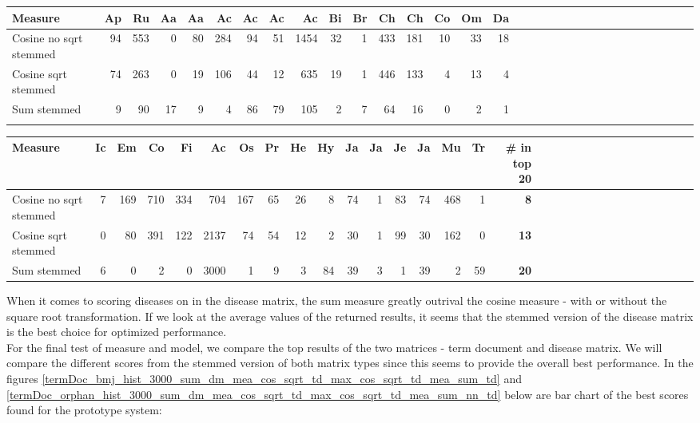 \begin{table}[H]
\begin{tiny}
  \begin{tabular}{|l|r|r|r|r|r|r|r|r|r|r|r|r|r|r|r|r|r|r|r|r|r|r|r|r|r|r|r|r|r|r|r|}
    \hline
    Measure &Ap&Ru&Aa&Aa&Ac&Ac&Ac&Ac&Bi&Br&Ch&Ch&Co&Om&Da\\
    \hline
    Cosine no sqrt stemmed &94&553&0&80&284&94&51&1454&32&1&433&181&10&33&18 \\
    \hline
    Cosine sqrt stemmed &74&263&0&19&106&44&12&635&19&1&446&133&4&13&4 \\
    \hline
    Sum stemmed &9&90&17&9&4&86&79&105&2&7&64&16&0&2&1\\
    \hline
    \multicolumn{16}{c}{} \\
    \end{tabular}
    \begin{tabular}{|l|r|r|r|r|r|r|r|r|r|r|r|r|r|r|r|r|r|r|r|r|r|r|r|r|r|r|r|r|r|r|}
    \hline
     Measure &Ic&Em&Co&Fi&Ac&Os&Pr&He&Hy&Ja&Ja&Je&Ja&Mu&Tr &  \scriptsize{\textbf{\# in top 20}} \\
    \hline
     Cosine no sqrt stemmed &7&169&710&334&704&167&65&26&8&74&1&83&74&468&1 & \scriptsize{\textbf{8}} \\
    \hline
     Cosine sqrt stemmed &0&80&391&122&2137&74&54&12&2&30&1&99&30&162&0 &\scriptsize{\textbf{13}} \\
    \hline
     Sum stemmed &6&0&2&0&3000&1&9&3&84&39&3&1&39&2&59 & \scriptsize{\textbf{20}} \\
     \hline
  \end{tabular}
\end{tiny}
\end{table}

When it comes to scoring diseases on in the disease matrix, the sum measure greatly outrival the 
cosine measure - with or without the square root transformation. If we look at the average values 
of the returned results, it seems that the stemmed version of the disease matrix is the best choice 
for optimized performance. \\

For the final test of measure and model, we compare the top results of the two matrices - term 
document and disease matrix. We will compare the different scores from the stemmed version of 
both matrix types since this seems to provide the overall best performance. In the figures 
\ref{termDoc_bmj_hist_3000_sum_dm_mea_cos_sqrt_td_max_cos_sqrt_td_mea_sum_td} and 
\ref{termDoc_orphan_hist_3000_sum_dm_mea_cos_sqrt_td_max_cos_sqrt_td_mea_sum_nn_td} below are 
bar chart of the best scores found for the prototype system:

